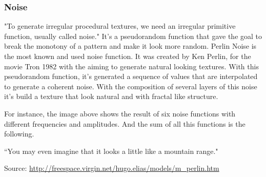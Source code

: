 
\subsubsection{Noise} %
\label{ssub:noise}


"To generate irregular procedural textures, we need an irregular primitive function,
usually called noise." It's a pseudorandom function that gave the goal to break the monotony of a pattern and make it look more random.
Perlin Noise is the most known and used noise function. It was created by Ken Perlin, for the movie Tron 1982 with the aiming to generate natural looking textures.
With this pseudorandom function, it's generated a sequence of values that are interpolated to generate a coherent noise. With the composition of several layers of this noise it's build a texture that look natural and with fractal like structure.




 For instance, the image above shows the result of six noise functions with different frequencies and amplitudes. And the sum of all this functions is the following.

``You may even imagine that it looks a little like a mountain range."

Source: \url{http://freespace.virgin.net/hugo.elias/models/m_perlin.htm}



